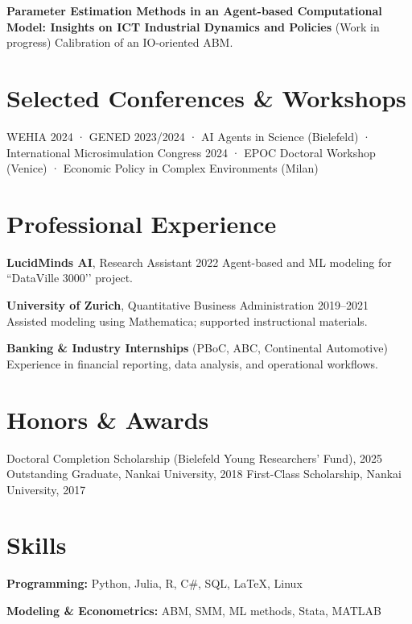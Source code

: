 \documentclass[a4paper,11pt]{article}
\begin{document}
\textbf{Parameter Estimation Methods in an Agent-based Computational Model: Insights on ICT Industrial Dynamics and Policies} (Work in progress) Calibration of an IO-oriented ABM. 

\section{Selected Conferences \& Workshops}

WEHIA 2024 · GENED 2023/2024 · AI Agents in Science (Bielefeld) ·  
International Microsimulation Congress 2024 · EPOC Doctoral Workshop (Venice) ·  
Economic Policy in Complex Environments (Milan)

\section{Professional Experience}

\textbf{LucidMinds AI}, Research Assistant \hfill 2022  
Agent-based and ML modeling for “DataVille 3000’’ project.

\textbf{University of Zurich}, Quantitative Business Administration \hfill 2019–2021  
Assisted modeling using Mathematica; supported instructional materials.

\textbf{Banking \& Industry Internships} (PBoC, ABC, Continental Automotive)  
Experience in financial reporting, data analysis, and operational workflows.

\section{Honors \& Awards}

Doctoral Completion Scholarship (Bielefeld Young Researchers’ Fund), 2025  
Outstanding Graduate, Nankai University, 2018  
First-Class Scholarship, Nankai University, 2017  

\section{Skills}

\textbf{Programming:} Python, Julia, R, C\#, SQL, LaTeX, Linux  

\textbf{Modeling \& Econometrics:} ABM, SMM, ML methods, Stata, MATLAB  
\end{document}
